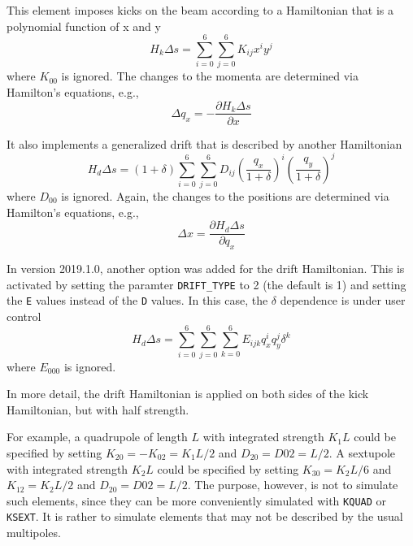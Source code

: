 This element imposes kicks on the beam according
to a Hamiltonian that is a polynomial function of x and y 
\begin{equation}
H_k\Delta s = \sum_{i=0}^{6} \sum_{j=0}^{6} K_{ij} x^i y^j 
\end{equation}
where $K_{00}$ is ignored.
The changes to the momenta are determined via Hamilton's equations, e.g.,
\begin{equation}
\Delta q_x = -\frac{\partial H_k\Delta s}{\partial x}
\end{equation}

It also implements a generalized drift that is described by another Hamiltonian
\begin{equation}
H_d\Delta s = (1+\delta) \sum_{i=0}^{6} \sum_{j=0}^{6} D_{ij} \left(\frac{q_x}{1+\delta}\right)^i \left(\frac{q_y}{1+\delta}\right)^j
\end{equation}
where $D_{00}$ is ignored.
Again, the changes to the positions are determined via Hamilton's equations, e.g., 
\begin{equation}
\Delta x = \frac{\partial H_d\Delta s}{\partial q_x}
\end{equation}

In version 2019.1.0, another option was added for the drift Hamiltonian.
This is activated by setting the paramter \verb|DRIFT_TYPE| to 2 (the default is 1)
and setting the \verb|E| values instead of the \verb|D| values.
In this case, the $\delta$ dependence is under user control
\begin{equation}
H_d\Delta s = \sum_{i=0}^{6} \sum_{j=0}^{6} \sum_{k=0}^{6} E_{ijk} q_x^i q_y^j \delta^k
\end{equation}
where $E_{000}$ is ignored.

In more detail, the drift Hamiltonian is applied on both sides of the kick Hamiltonian, but with
half strength. 

For example, a quadrupole of length $L$ with integrated strength $K_1 L$  could be specified by setting
$K_{20} = -K_{02} = K_1 L/2$ and $D_20 = D02 = L/2$.
A sextupole with integrated strength $K_2 L$ could be specified by setting $K_{30} = K_2 L/6$ and $K_{12} = K_2 L/2$
and $D_20 = D02 = L/2$.
The purpose, however, is not to simulate such elements, since they can be more conveniently simulated with 
\verb|KQUAD| or \verb|KSEXT|.
It is rather to simulate elements that may not be described by the usual multipoles.

